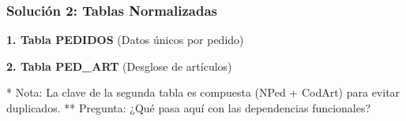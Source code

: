 \documentclass{beamer}
\begin{document}
\begin{frame}
  \frametitle{Solución 2: Tablas Normalizadas}

  \textbf{1. Tabla PEDIDOS} (Datos únicos por pedido)
  \begin{center}
  \end{center}

  \textbf{2. Tabla PED\_ART} (Desglose de artículos)
  \begin{center}
  \end{center}
  \tiny{* Nota: La clave de la segunda tabla es compuesta (NPed + CodArt) para evitar duplicados.}
  \tiny{** Pregunta: ¿Qué pasa aquí con las dependencias funcionales?}
\end{frame}
\end{document}
